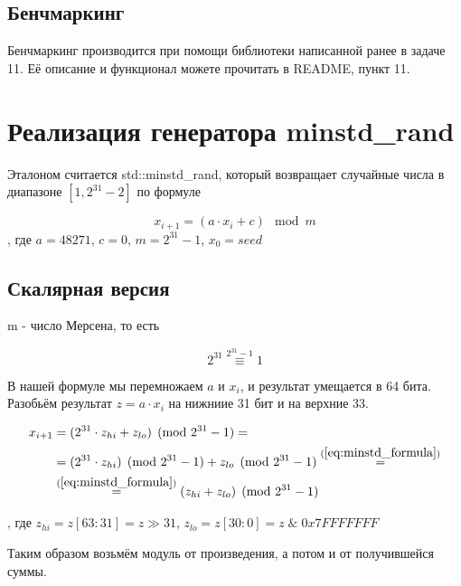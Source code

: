 \documentclass[12pt]{extarticle}
\begin{document}
\subsection{Бенчмаркинг}

Бенчмаркинг производится при помощи библиотеки написанной ранее в задаче 11. Её описание и функционал можете прочитать в README, пункт 11.

\section{Реализация генератора minstd_rand}

Эталоном считается std::minstd\_rand, который возвращает случайные числа в диапазоне $[1, 2^{31}-2]$ по формуле

\begin{equation}
    \label{eq:minstd_formula}
    x_{i+1} = (a \cdot x_i + c) \mod m
\end{equation}
, где $a = 48271$, $c = 0$, $m = 2^{31} - 1$, $x_0 = seed$

\subsection{Скалярная версия}

m - число Мерсена, то есть

\begin{equation}
    2^{31} \overset{2^{31}-1}{\equiv} 1 
\end{equation}

В нашей формуле мы перемножаем $a$ и $x_i$, и результат умещается в 64 бита. Разобьём результат $z = a \cdot x_i$ на нижниие 31 бит и на верхние 33.

\begin{equation}
\begin{split}
    x_{i+1} &= (2^{31}\cdot z_{hi} + z_{lo}) \pmod{2^{31} - 1} = \\
            &= (2^{31} \cdot z_{hi})\pmod{2^{31} - 1} + z_{lo} \pmod{2^{31} - 1} \overset{(\ref{eq:minstd_formula})}{=}  \\
            &\overset{(\ref{eq:minstd_formula})}{=} (z_{hi} + z_{lo}) \pmod{2^{31} - 1}
\end{split}
\end{equation}

, где $z_{hi} = z[63:31] = z \gg 31$, $z_{lo} = z[30:0] = z\;\&\;0x7FFFFFFF$

Таким образом возьмём модуль от произведения, а потом и от получившейся суммы.
\end{document}
